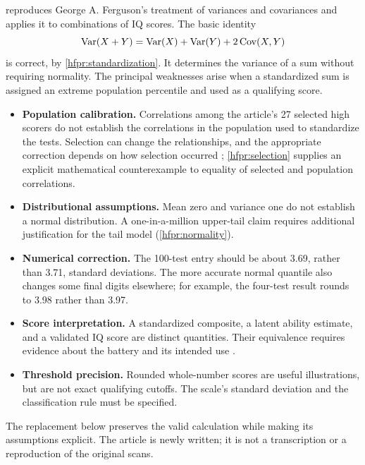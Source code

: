 \citet{hoeflin} reproduces George A. Ferguson's treatment of variances and
covariances and applies it to combinations of IQ scores. The basic identity
\begin{equation}
  \operatorname{Var}(X+Y)=\operatorname{Var}(X)+\operatorname{Var}(Y)+2\operatorname{Cov}(X,Y)
  \label{eq:variance-sum}
\end{equation}
is correct, by \cref{hfpr:standardization}. It determines the variance of a sum without requiring normality.
The principal weaknesses arise when a standardized sum is assigned an extreme
population percentile and used as a qualifying score.

\begin{itemize}
  \item \textbf{Population calibration.} Correlations among the article's
  27 selected high scorers do not establish the correlations in the population
  used to standardize the tests. Selection can change the relationships, and
  the appropriate correction depends on how selection occurred
  \citep{sackett2000}; \cref{hfpr:selection} supplies an explicit
  mathematical counterexample to equality of selected and population
  correlations.
  \item \textbf{Distributional assumptions.} Mean zero and variance one do
  not establish a normal distribution. A one-in-a-million upper-tail claim
  requires additional justification for the tail model
  (\cref{hfpr:normality}).
  \item \textbf{Numerical correction.} The 100-test entry should be about
  3.69, rather than 3.71, standard deviations. The more accurate normal
  quantile also changes some final digits elsewhere; for example, the
  four-test result rounds to 3.98 rather than 3.97.
  \item \textbf{Score interpretation.} A standardized composite, a latent
  ability estimate, and a validated IQ score are distinct quantities.
  Their equivalence requires evidence about the battery and its intended use
  \citep[Standard~1.14]{standards2014}.
  \item \textbf{Threshold precision.} Rounded whole-number scores are useful
  illustrations, but are not exact qualifying cutoffs. The scale's standard
  deviation and the classification rule must be specified.
\end{itemize}

The replacement below preserves the valid calculation while making its
assumptions explicit. The article is newly written; it is not a transcription
or a reproduction of the original scans.

